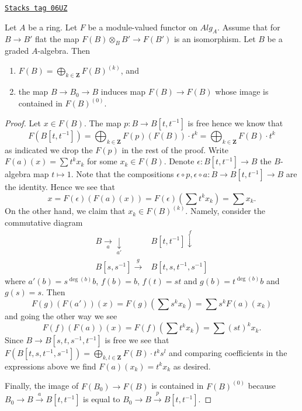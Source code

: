 \begin{lemma}
\label{adequate-lemma-flat-functor-split}
\href{https://stacks.math.columbia.edu/tag/06UZ}{\texttt{Stacks tag 06UZ}}

Let $A$ be a ring.
Let $F$ be a module-valued functor on $\textit{Alg}_A$.
Assume that for $B \to B'$ flat the map
$F(B) \otimes_B B' \to F(B')$ is an isomorphism.
Let $B$ be a graded $A$-algebra. Then
\begin{enumerate}
\item $F(B) = \bigoplus_{k \in \mathbf{Z}} F(B)^{(k)}$, and
\item the map $B \to B_0 \to B$ induces map $F(B) \to F(B)$
whose image is contained in $F(B)^{(0)}$.
\end{enumerate}
\end{lemma}

\begin{proof}
Let $x \in F(B)$. The map $p : B \to B[t, t^{-1}]$ is free
hence we know that
$$
F(B[t, t^{-1}]) =
\bigoplus\nolimits_{k \in \mathbf{Z}} F(p)(F(B)) \cdot t^k =
\bigoplus\nolimits_{k \in \mathbf{Z}} F(B) \cdot t^k
$$
as indicated we drop the $F(p)$ in the rest of the proof.
Write $F(a)(x) = \sum t^k x_k$ for some $x_k \in F(B)$.
Denote $\epsilon : B[t, t^{-1}] \to B$
the $B$-algebra map $t \mapsto 1$. Note that the compositions
$\epsilon \circ p, \epsilon \circ a : B \to B[t, t^{-1}] \to B$ are
the identity. Hence we see that
$$
x = F(\epsilon)(F(a)(x)) = F(\epsilon)(\sum t^k x_k) = \sum x_k.
$$
On the other hand, we claim that $x_k \in F(B)^{(k)}$. Namely, consider
the commutative diagram
$$
\begin{array}{cc}B \underset{a}{\longrightarrow}\underset{a'}{\downarrow} & B[t, t^{-1}] \overset{f}{\downarrow} \\ B[s, s^{-1}] \overset{g}{\longrightarrow} & B[t, s, t^{-1}, s^{-1}]\end{array}
$$
where $a'(b) = s^{\deg(b)}b$, $f(b) = b$, $f(t) = st$ and
$g(b) = t^{\deg(b)}b$ and $g(s) = s$. Then
$$
F(g)(F(a'))(x) = F(g)(\sum s^k x_k) =
\sum s^k F(a)(x_k)
$$
and going the other way we see
$$
F(f)(F(a))(x) = F(f)(\sum t^k x_k) = \sum (st)^k x_k.
$$
Since $B \to B[s, t, s^{-1}, t^{-1}]$ is free we see that
$F(B[t, s, t^{-1}, s^{-1}]) =
\bigoplus_{k, l \in \mathbf{Z}} F(B) \cdot t^ks^l$ and
comparing coefficients in the expressions above we find
$F(a)(x_k) = t^k x_k$ as desired.

\medskip\noindent
Finally, the image of $F(B_0) \to F(B)$ is contained in $F(B)^{(0)}$
because $B_0 \to B \xrightarrow{a} B[t, t^{-1}]$ is equal to
$B_0 \to B \xrightarrow{p} B[t, t^{-1}]$.
\end{proof}

